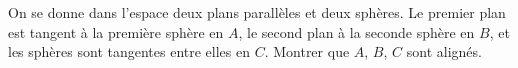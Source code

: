 On se donne dans l'espace deux plans parallèles et deux sphères. Le premier plan est tangent à la première sphère en $A$, le second plan à la seconde sphère en $B$, et les sphères sont tangentes entre elles en $C$. Montrer que $A$, $B$, $C$ sont alignés.
